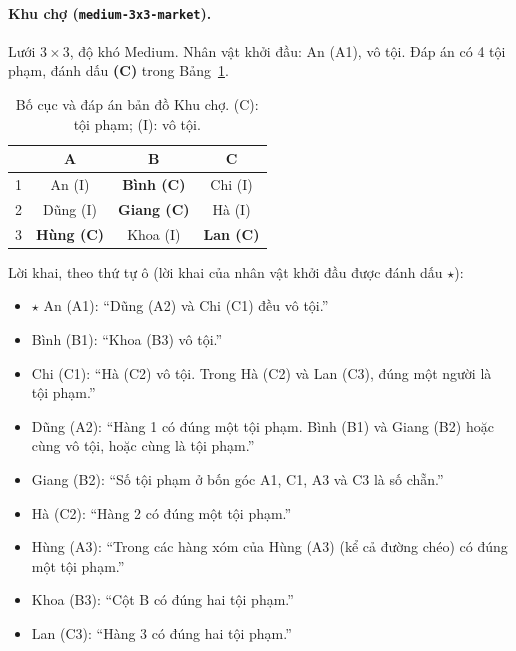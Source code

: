 \paragraph{Khu chợ (\texttt{medium-3x3-market}).}
Lưới $3\times3$, độ khó Medium. Nhân vật khởi đầu: An (A1), vô tội. Đáp án có 4 tội phạm, đánh dấu \textbf{(C)} trong Bảng~\ref{tab:map_market}.
\begin{table}[htbp]
  \centering\small
  \caption{Bố cục và đáp án bản đồ Khu chợ. (C): tội phạm; (I): vô tội.}
  \label{tab:map_market}
  \begin{tabular}{cccc}
    \toprule
    & A & B & C \\
    \midrule
    1 & An (I) & \textbf{Bình (C)} & Chi (I) \\
    2 & Dũng (I) & \textbf{Giang (C)} & Hà (I) \\
    3 & \textbf{Hùng (C)} & Khoa (I) & \textbf{Lan (C)} \\
    \bottomrule
  \end{tabular}
\end{table}
\noindent Lời khai, theo thứ tự ô (lời khai của nhân vật khởi đầu được đánh dấu $\star$):
\begin{itemize}\setlength{\itemsep}{0pt}\small
  \item $\star$ An (A1): ``Dũng (A2) và Chi (C1) đều vô tội.''
  \item Bình (B1): ``Khoa (B3) vô tội.''
  \item Chi (C1): ``Hà (C2) vô tội. Trong Hà (C2) và Lan (C3), đúng một người là tội phạm.''
  \item Dũng (A2): ``Hàng 1 có đúng một tội phạm. Bình (B1) và Giang (B2) hoặc cùng vô tội, hoặc cùng là tội phạm.''
  \item Giang (B2): ``Số tội phạm ở bốn góc A1, C1, A3 và C3 là số chẵn.''
  \item Hà (C2): ``Hàng 2 có đúng một tội phạm.''
  \item Hùng (A3): ``Trong các hàng xóm của Hùng (A3) (kể cả đường chéo) có đúng một tội phạm.''
  \item Khoa (B3): ``Cột B có đúng hai tội phạm.''
  \item Lan (C3): ``Hàng 3 có đúng hai tội phạm.''
\end{itemize}

